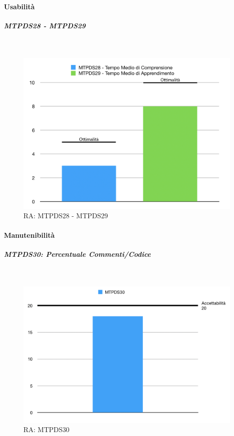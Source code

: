 \paragraph{Usabilità}

\subparagraph{MTPDS28 - MTPDS29} \-\\

\begin{figure}[H]
	\begin{center}
		\includegraphics[scale=0.5]{./images/grafici_RA/Usabilita.png} 
		\caption{RA: MTPDS28 - MTPDS29}
	\end{center}
\end{figure}

\paragraph{Manutenibilità} 

\subparagraph{MTPDS30: Percentuale Commenti/Codice} \-\\

\begin{figure}[H]
	\begin{center}
		\includegraphics[scale=0.5]{./images/grafici_RA/MTPDS30.png} 
		\caption{RA: MTPDS30}
	\end{center}
\end{figure}
